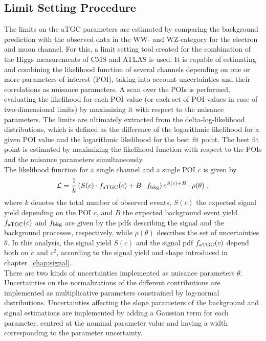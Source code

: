 \subsection{Limit Setting Procedure}
\label{subsec:limsetproc}
The limits on the aTGC parameters are estimated by comparing the background prediction with the observed data in the WW- and WZ-category for the electron and muon channel. For this, a limit setting tool created for the combination of the Higgs measurements of CMS and ATLAS \cite{combine} is used. It is capable of estimating and combining the likelihood function of several channels depending on one or more parameters of interest (POI), taking into account uncertainties and their correlations as nuisance parameters. A scan over the POIs is performed, evaluating the likelihood for each POI value (or each set of POI values in case of two-dimensional limits) by maximizing it with respect to the nuisance parameters. The limits are ultimately extracted from the delta-log-likelihood distributions, which is defined as the difference of the logarithmic likelihood for a given POI value and the logarithmic likelihood for the best fit point. The best fit point is estimated by maximizing the likelihood function with respect to the POIs and the nuisance parameters simultaneously.\\

\noindent The likelihood function for a single channel and a single POI $c$ is given by
\begin{equation}
\mathcal{L} = \frac{1}{k} \left( S(c)\cdot f_{\rm aTGC}(c) + B \cdot f_{\rm bkg} \right) e^{S(c) + B} \cdot \rho(\theta)~,
\end{equation}
where $k$ denotes the total number of observed events, $S(c)$ the expected signal yield depending on the POI $c$, and $B$ the expected background event yield. $f_{\rm aTGC}(c)$ and $f_{\rm bkg}$ are given by the pdfs describing the signal and the background processes, respectively, while  $\rho(\theta)$ describes the set of uncertainties $\theta$. In this analysis, the signal yield $S(c)$ and the signal pdf $f_{\rm aTGC}(c)$ depend both on $c$ and $c^2$, according to the signal yield and shape introduced in chapter~\ref{chap:signal}.\\

\noindent There are two kinds of uncertainties implemented as nuisance parameters $\theta$. Uncertainties on the normalizations of the different contributions are implemented as multiplicative parameters constrained by log-normal distributions. Uncertainties affecting the slope parameters of the background and signal estimations are implemented by adding a Gaussian term for each parameter, centred at the nominal parameter value and having a width corresponding to the parameter uncertainty.\\

